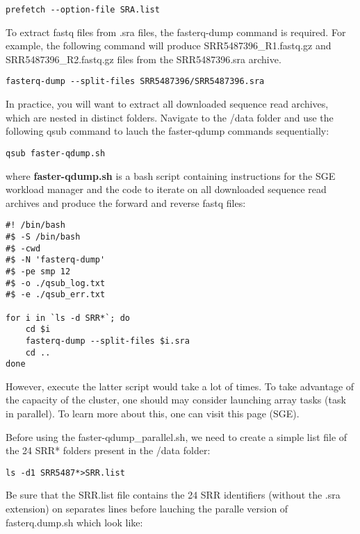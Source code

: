 \begin{verbatim}
prefetch --option-file SRA.list
\end{verbatim}

To extract fastq files from .sra files, the fasterq-dump command is required. For example, the following command will produce SRR5487396\_R1.fastq.gz and SRR5487396\_R2.fastq.gz files from the SRR5487396.sra archive.

\begin{verbatim}
fasterq-dump --split-files SRR5487396/SRR5487396.sra
\end{verbatim}

In practice, you will want to extract all downloaded sequence read archives, which are nested in distinct folders. Navigate to the /data folder and use the following qsub command to lauch the faster-qdump commands sequentially:

\begin{verbatim}
qsub faster-qdump.sh
\end{verbatim}

where \textbf{faster-qdump.sh} is a bash script containing instructions for the SGE workload manager and the code to iterate on all downloaded sequence read archives and produce the forward and reverse fastq files:

\begin{verbatim}
#! /bin/bash
#$ -S /bin/bash
#$ -cwd
#$ -N 'fasterq-dump'
#$ -pe smp 12
#$ -o ./qsub_log.txt
#$ -e ./qsub_err.txt
	
for i in `ls -d SRR*`; do
	cd $i
	fasterq-dump --split-files $i.sra
	cd ..
done
\end{verbatim}



However, execute the latter script would take a lot of times. To take advantage of the capacity of the cluster, one should may consider launching array tasks (task in parallel). To learn more about this, one can visit this page (SGE).

Before using the faster-qdump\_parallel.sh, we need to create a simple list file of the 24 SRR* folders present in the /data folder:

\begin{verbatim}
ls -d1 SRR5487*>SRR.list
\end{verbatim}

Be sure that the SRR.list file contains the 24 SRR identifiers (without the .sra extension) on separates lines before lauching the paralle version of fasterq.dump.sh which look like:

